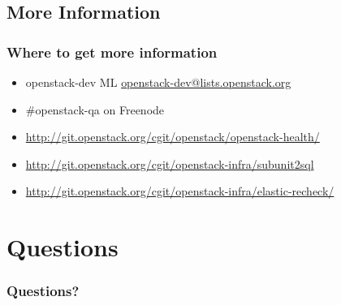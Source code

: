 \documentclass[aspectratio=169,11pt,hyperref={colorlinks=true}]{beamer}
\begin{document}
\subsection{More Information}
\begin{frame}
\frametitle{Where to get more information}
    \begin{itemize}
        \item openstack-dev ML\: \href{mailto:openstack-dev@lists.openstack.org}{openstack-dev@lists.openstack.org}
        \item \#openstack-qa on Freenode
        \item \href{http://git.openstack.org/cgit/openstack/openstack-health/}{http://git.openstack.org/cgit/openstack/openstack-health/}
        \item \href{http://git.openstack.org/cgit/openstack-infra/subunit2sql}{http://git.openstack.org/cgit/openstack-infra/subunit2sql}
        \item \href{http://git.openstack.org/cgit/openstack-infra/elastic-recheck/}{http://git.openstack.org/cgit/openstack-infra/elastic-recheck/}
    \end{itemize}
\end{frame}

\section{Questions}
\begin{frame}
\frametitle{Questions?}
\end{frame}
\end{document}
